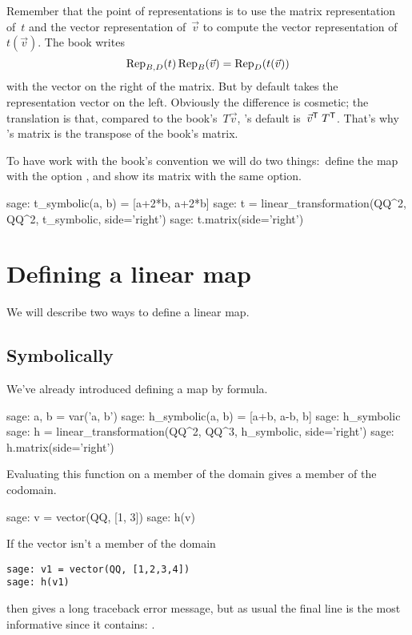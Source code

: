Remember that the point of representations is to
use the matrix representation of~$t$ and the vector representation of~$\vec{v}$ 
to compute
the vector representation of~$t(\vec{v})$.
The book writes
\begin{equation*}
  \rep{t}{B,D}\,\rep{\vec{v}}{B}=\rep{t(\vec{v})}{D}
\end{equation*}
with the vector on the right of the matrix.
But \Sage{} by default takes 
the representation vector on the left.
Obviously the difference is cosmetic; 
the translation is that, compared to the book's~$T\vec{v}$,
\Sage{}'s default is~$\trans{\vec{v}}\;\trans{T}$.
That's why \Sage{}'s matrix is the transpose of the book's matrix.

To have \Sage{} work with  the book's convention we will do two 
things:~define the map with the
option , and show its
matrix with the same option.
\begin{sagecommandline}
sage: t_symbolic(a, b) = [a+2*b, a+2*b]         
sage: t = linear_transformation(QQ^2, QQ^2, t_symbolic, side='right')  
sage: t.matrix(side='right')
\end{sagecommandline}


  

\section{Defining a linear map}
We will describe two ways to 
define a linear map.

\subsection{Symbolically}
We've already introduced defining a map by formula.
\begin{sagecommandline}
sage: a, b = var('a, b')   
sage: h_symbolic(a, b) = [a+b, a-b, b]         
sage: h_symbolic       
sage: h = linear_transformation(QQ^2, QQ^3, h_symbolic, side='right')
sage: h.matrix(side='right') 
\end{sagecommandline}
Evaluating this function on a member of the domain gives a member
of the codomain. 
\begin{sagecommandline}
sage: v = vector(QQ, [1, 3])  
sage: h(v)
\end{sagecommandline}

If the vector isn't a member of the domain
\begin{lstlisting}
sage: v1 = vector(QQ, [1,2,3,4])
sage: h(v1)
\end{lstlisting}
then \Sage{} gives a long traceback error message, but as usual the final line 
is the most informative since it contains:
.

